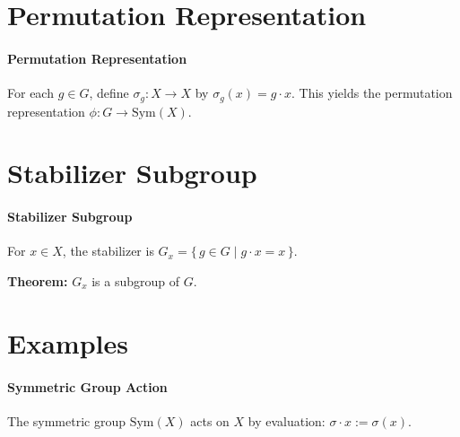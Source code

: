 \documentclass[
	aspectratio=169, %
	t, %
	onlytextwidth, %
	10pt, %
]{beamer}
\newcommand{\leancodeurl}{}
\newcommand{\setleancodeurl}[1]{\renewcommand{\leancodeurl}{#1}}
\newcommand{\leancodefile}[3][]{%
    \setleancodeurl{#3}%
    \inputminted[fontfamily=FreeMono,breaklines,breakanywhere,tabsize=4,showspaces=false,linenos=true,#1]{lean4}{#2}%
}
\begin{document}

\section{Permutation Representation}

\begin{frame}
	\framesubtitle{Permutation Representation}

	For each $g \in G$, define $\sigma_g : X \to X$ by $\sigma_g(x) = g \cdot x$. This yields the permutation representation $\phi : G \to \mathrm{Sym}(X)$.

\end{frame}


\section{Stabilizer Subgroup}

\begin{frame}
	\framesubtitle{Stabilizer Subgroup}

	For $x \in X$, the stabilizer is $G_x = \{\, g \in G \mid g \cdot x = x \,\}$.


	\textbf{Theorem:} $G_x$ is a subgroup of $G$.
\end{frame}


\section{Examples}

\begin{frame}
	\framesubtitle{Symmetric Group Action}

	The symmetric group $\mathrm{Sym}(X)$ acts on $X$ by evaluation: $\sigma \cdot x := \sigma(x)$.

\end{frame}

\end{document}
